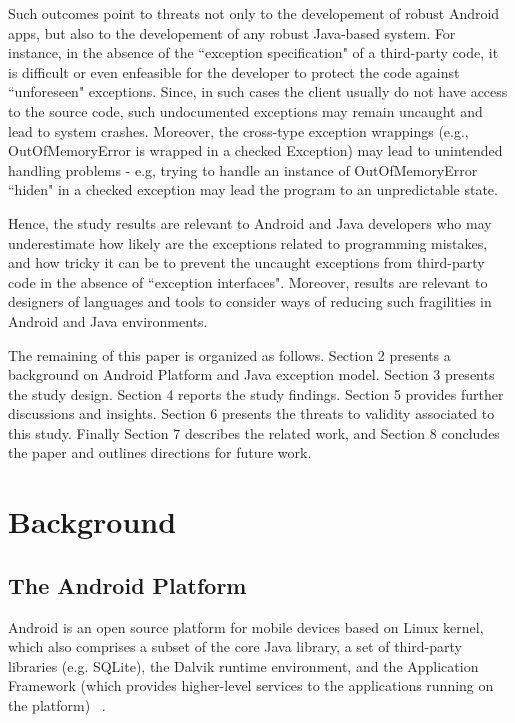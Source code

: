 \documentclass[conference]{IEEEtran}
\begin{document}
Such outcomes point to threats not only to the developement of robust Android apps, 
but also to the developement of any robust Java-based system. For instance, in the absence of the 
``exception specification" of  a third-party code, it is difficult or 
even enfeasible for the developer to protect the code against ``unforeseen" exceptions. 
Since, in such cases the client usually do not have access to the source code, such undocumented exceptions may 
remain uncaught and lead to system crashes. Moreover, the cross-type exception wrappings 
(e.g., OutOfMemoryError is wrapped in a checked Exception) 
may lead to unintended handling problems - e.g, trying to handle an instance of OutOfMemoryError ``hiden" in 
a checked exception may lead the program to an unpredictable state.

Hence, the study results are relevant to Android and 
Java developers who may underestimate how likely are the
 exceptions related to programming mistakes, and how 
 tricky it can be to prevent the uncaught exceptions from third-party code
 in the absence of ``exception interfaces". Moreover, results are relevant to 
designers of languages and tools to consider ways of reducing such fragilities 
in Android and Java environments.

The remaining of this paper is organized as follows. Section 2 presents a
background on Android Platform and Java exception model. 
Section 3 presents the study design. Section 4 reports the study findings. 
Section 5 provides further discussions and insights.
Section 6 presents the threats to validity associated to this study. Finally Section
7 describes the related work, and Section 8 concludes the paper and outlines
directions for future work.

\section{Background}
\label{sec:back}

\subsection{The Android Platform} \label{sec:extypes}
Android is an open source platform for mobile devices based on Linux kernel,
which also comprises a subset of the core Java library, a set of third-party libraries (e.g.  SQLite),
the Dalvik runtime environment, and the Application Framework (which provides 
higher-level services to the applications running on the platform) ~\cite{andguide}.
\end{document}
